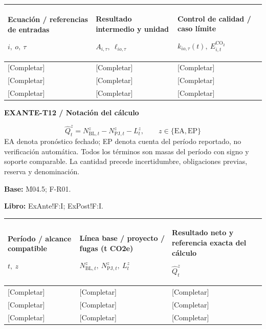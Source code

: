 {\sffamily\fontsize{8.3}{10.3}\selectfont\begin{longtable}{@{}P{54.83mm} P{54.83mm} P{54.83mm}@{}}
\toprule
\textbf{Ecuación / referencias de entradas}\par {\normalfont\fontsize{8.2}{10}\selectfont $i,\ o,\ \tau$} & \textbf{Resultado intermedio y unidad}\par {\normalfont\fontsize{8.2}{10}\selectfont $A_{i,\tau},\ \ell_{io,\tau}$} & \textbf{Control de calidad / caso límite}\par {\normalfont\fontsize{8.2}{10}\selectfont $k_{io,\tau}(t),\ E^{\mathrm{CO_2}}_{i,t}$}\\\midrule\endhead
\rule{0pt}{8mm}[Completar] & [Completar] & [Completar]\\\hline
\rule{0pt}{8mm}[Completar] & [Completar] & [Completar]\\\hline
\rule{0pt}{8mm}[Completar] & [Completar] & [Completar]\\\hline
\end{longtable}}
\par\begingroup\sffamily\fontsize{8}{10}\selectfont\color{NEBGreen}\setlength{\parskip}{2pt}\setlength{\abovedisplayskip}{4pt}\setlength{\belowdisplayskip}{4pt}\setlength{\abovedisplayshortskip}{2pt}\setlength{\belowdisplayshortskip}{3pt}
\textbf{EXANTE-T12 / Notación del cálculo}\par
{\fontsize{9}{11}\selectfont\[ \widehat Q_t^z=N_{\mathrm{BL},t}^z-N_{\mathrm{PJ},t}^z-L_t^z,\qquad z\in\{\mathrm{EA},\mathrm{EP}\} \]}
EA denota pronóstico fechado; EP denota cuenta del período reportado, no verificación automática. Todos los términos son masas del período con signo y soporte comparable. La cantidad precede incertidumbre, obligaciones previas, reserva y denominación.\par
\textbf{Base:} M04.5; F-R01.\par
\textbf{Libro:} ExAnte!F:I; ExPost!F:I.\par\endgroup
{\sffamily\fontsize{8.3}{10.3}\selectfont\begin{longtable}{@{}P{54.83mm} P{54.83mm} P{54.83mm}@{}}
\toprule
\textbf{Período / alcance compatible}\par {\normalfont\fontsize{8.2}{10}\selectfont $t,\ z$} & \textbf{Línea base / proyecto / fugas (t CO2e)}\par {\normalfont\fontsize{8.2}{10}\selectfont $N_{\mathrm{BL},t}^z,\ N_{\mathrm{PJ},t}^z,\ L_t^z$} & \textbf{Resultado neto y referencia exacta del cálculo}\par {\normalfont\fontsize{8.2}{10}\selectfont $\widehat Q_t^z$}\\\midrule\endhead
\rule{0pt}{8mm}[Completar] & [Completar] & [Completar]\\\hline
\rule{0pt}{8mm}[Completar] & [Completar] & [Completar]\\\hline
\rule{0pt}{8mm}[Completar] & [Completar] & [Completar]\\\hline
\end{longtable}}
